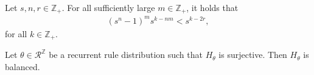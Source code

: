 \documentclass[runningheads]{llncs}
\newcommand{\Z}{\mathbb{Z}}
\begin{document}
%
%
%


\begin{lemma} \label{ineq2} 
Let $s,n,r \in \Z_+$. For all sufficiently large $m \in \Z_+$, it holds that
\begin{align*}
(s^n-1)^m s^{k-nm} < s^{k-2r},
\end{align*}
for all $k \in \Z_+$. 
\end{lemma} 

\begin{theorem}
Let $\theta \in \mathcal{R}^\Z$ be a recurrent rule distribution such that $H_\theta$ is surjective. Then $H_\theta$ is balanced.
\end{theorem}
\end{document}

